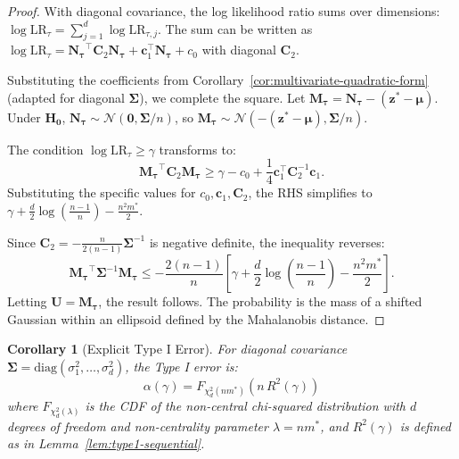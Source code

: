 \documentclass{article}
\theoremstyle{plain}
\newtheorem{corollary}[theorem]{Corollary}
\theoremstyle{definition}
\theoremstyle{remark}
\newcommand{\bs}{\boldsymbol}
\renewcommand{\leq}{\leqslant}
\renewcommand{\geq}{\geqslant}
\begin{document}
\begin{proof}
    With diagonal covariance, the log likelihood ratio sums over dimensions: $\log \mathrm{LR}_\tau = \sum_{j=1}^d \log \mathrm{LR}_{\tau,j}$.
    The sum can be written as $\log \mathrm{LR}_\tau = \mathbf{N_\tau}^\top \mathbf{C}_2 \mathbf{N_\tau} + \mathbf{c}_1^\top \mathbf{N_\tau} + c_0$ with diagonal $\mathbf{C}_2$.

    Substituting the coefficients from Corollary~\ref{cor:multivariate-quadratic-form} (adapted for diagonal $\bs\Sigma$), we complete the square. Let $\mathbf{M_\tau} = \mathbf{N_\tau} - (\mathbf{z}^* - \bs\mu)$. Under $\mathbf{H_0}$, $\mathbf{N_\tau} \sim \mathcal{N}(\mathbf{0}, \bs\Sigma/n)$, so $\mathbf{M_\tau} \sim \mathcal{N}(-(\mathbf{z}^* - \bs\mu), \bs\Sigma/n)$.
    
    The condition $\log \mathrm{LR}_\tau \geq \gamma$ transforms to:
    \begin{equation*}
        \mathbf{M_\tau}^\top \mathbf{C}_2 \mathbf{M_\tau} \geq \gamma - c_0 + \frac{1}{4}\mathbf{c}_1^\top \mathbf{C}_2^{-1} \mathbf{c}_1.
    \end{equation*}
    Substituting the specific values for $c_0, \mathbf{c}_1, \mathbf{C}_2$, the RHS simplifies to $\gamma + \frac{d}{2}\log\left(\frac{n-1}{n}\right) - \frac{n^2 m^*}{2}$.
    
    Since $\mathbf{C}_2 = -\frac{n}{2(n-1)}\bs\Sigma^{-1}$ is negative definite, the inequality reverses:
    \begin{equation*}
        \mathbf{M_\tau}^\top \bs\Sigma^{-1} \mathbf{M_\tau} \leq -\frac{2(n-1)}{n}\left[\gamma + \frac{d}{2}\log\left(\frac{n-1}{n}\right) - \frac{n^2 m^*}{2}\right].
    \end{equation*}
    Letting $\mathbf{U} = \mathbf{M_\tau}$, the result follows. The probability is the mass of a shifted Gaussian within an ellipsoid defined by the Mahalanobis distance.
\end{proof}

\begin{corollary}[Explicit Type I Error]
    \label{cor:multivariate-type1-explicit}
    For diagonal covariance $\bs\Sigma = \mathrm{diag}(\sigma_1^2, \ldots, \sigma_d^2)$, the Type I error is:
    \begin{equation*}
        \alpha(\gamma) = F_{\chi^2_d(n m^*)}\left(n \, R^2(\gamma)\right)
    \end{equation*}
    where $F_{\chi^2_d(\lambda)}$ is the CDF of the non-central chi-squared distribution with $d$ degrees of freedom and non-centrality parameter $\lambda = n m^*$, and $R^2(\gamma)$ is defined as in Lemma~\ref{lem:type1-sequential}.
\end{corollary}
\end{document}
